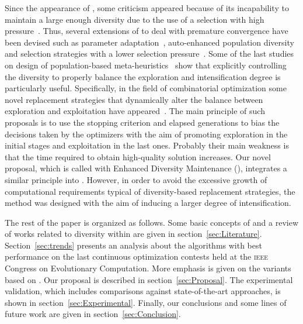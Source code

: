 Since the appearance of \DE{}, some criticism appeared because of its incapability to maintain a large
enough diversity due to the use of a selection with high pressure~\cite{sa2008exploration}.
%
Thus, several extensions of \DE{} to deal with premature convergence have been devised 
such as parameter adaptation~\cite{zaharie2003control}, 
auto-enhanced population diversity~\cite{yang2015differential} and selection strategies 
with a lower selection pressure~\cite{sa2008exploration}.
%
Some of the last studies on design of population-based meta-heuristics~\cite{Crepinsek:13} show that 
explicitly controlling the diversity to properly balance the exploration and intensification degree
is particularly useful.
%
Specifically, in the field of combinatorial optimization some novel replacement strategies that dynamically alter 
the balance between exploration and exploitation 
have appeared~\cite{segura2016novel}.
%
The main principle of such proposals is to use the stopping criterion and elapsed generations to bias the decisions 
taken by the optimizers with the aim of promoting exploration in the initial stages and exploitation in the last ones.
%
Probably their main weakness is that the time required to obtain high-quality solution increases.
%
Our novel proposal, which is called \DE{} with Enhanced Diversity Maintenance (\DEEDM{}), integrates a similar principle into \DE{}.
%
However, in order to avoid the excessive growth of computational requirements typical of diversity-based replacement strategies, 
the method was designed with the aim of inducing a larger degree of intensification.

The rest of the paper is organized as follows.
%
Some basic concepts of \DE{} and a review of works related to diversity within \DE{} are given in section~\ref{sec:Literature}.
%
Section~\ref{sec:trends} presents an analysis about the algorithms with best performance on the last continuous optimization 
contests held at the \textsc{ieee} Congress on Evolutionary Computation.
%
More emphasis is given on the variants based on \DE{}.
%
Our proposal is described in section~\ref{sec:Proposal}.
%
The experimental validation, which includes comparisons against state-of-the-art approaches, is shown in section~\ref{sec:Experimental}. 
%
Finally, our conclusions and some lines of future work are given in section~\ref{sec:Conclusion}.

